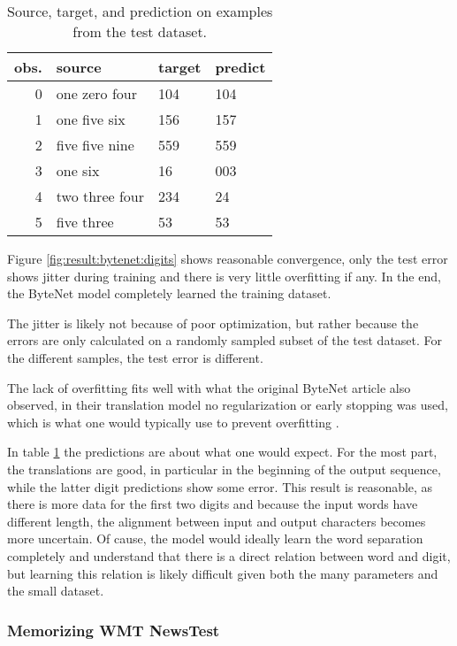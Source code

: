 \begin{table}[h]
\centering
\begin{tabular}{r|p{3.3cm} p{3.3cm} p{3.3cm}}
	obs. & source & target & predict\\ \hline
  0 & one zero four & 104 & 104 \\
  1 & one five six & 156 & 157 \\
  2 & five five nine & 559 & 559 \\
  3 & one six & 16 & 003 \\
  4 & two three four & 234 & 24 \\
  5 & five three & 53 & 53
\end{tabular}
\caption{Source, target, and prediction on examples from the test dataset.}
\label{table:result:bytenet:digits}
\end{table}

Figure \ref{fig:result:bytenet:digits} shows reasonable convergence, only the test error shows jitter during training and there is very little overfitting if any. In the end, the ByteNet model completely learned the training dataset.

The jitter is likely not because of poor optimization, but rather because the errors are only calculated on a randomly sampled subset of the test dataset. For the different samples, the test error is different.

The lack of overfitting fits well with what the original ByteNet article also observed, in their translation model no regularization or early stopping was used, which is what one would typically use to prevent overfitting \cite{bytenet}.

In table \ref{table:result:bytenet:digits} the predictions are about what one would expect. For the most part, the translations are good, in particular in the beginning of the output sequence, while the latter digit predictions show some error. This result is reasonable, as there is more data for the first two digits and because the input words have different length, the alignment between input and output characters becomes more uncertain. Of cause, the model would ideally learn the word separation completely and understand that there is a direct relation between word and digit, but learning this relation is likely difficult given both the many parameters and the small dataset.

\clearpage
\subsubsection{Memorizing WMT NewsTest}


